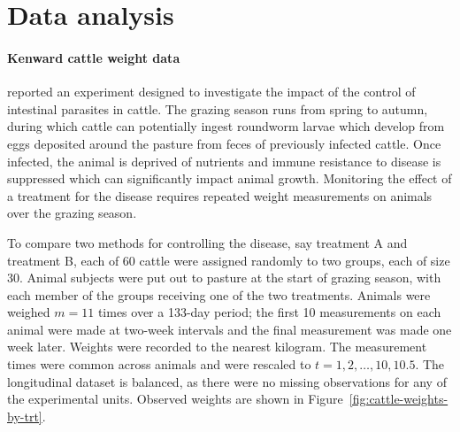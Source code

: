 
\chapter{Data analysis} \label{chapter-5-data-analysis}
\subsubsection{Kenward cattle weight data}


\cite{kenward1987method} reported an experiment designed to investigate the impact of the control of intestinal parasites in cattle. The grazing season runs from spring to autumn, during which cattle can potentially ingest roundworm larvae which develop from eggs deposited around the pasture from feces of previously infected cattle. Once infected, the animal is deprived of nutrients and immune resistance to disease is suppressed which can significantly impact animal growth. Monitoring the effect of a treatment for the disease requires repeated weight measurements on animals over the grazing season. 

\bigskip

To compare two methods for controlling the disease, say treatment A and treatment B, each of 60 cattle were assigned randomly to two groups, each of size 30. Animal subjects were put out to pasture at the start of grazing season, with each member of the groups receiving one of the two treatments. Animals were weighed $m = 11$ times over a 133-day period; the first 10 measurements on each animal were made at two-week intervals and the final measurement was made one week later. Weights were recorded to the nearest kilogram. The measurement times were common across animals and were rescaled to $t = 1, 2, \dots, 10, 10.5$. The longitudinal dataset is balanced, as there were no missing observations for any of the experimental units. Observed weights are shown in Figure~\ref{fig:cattle-weights-by-trt}.
  
